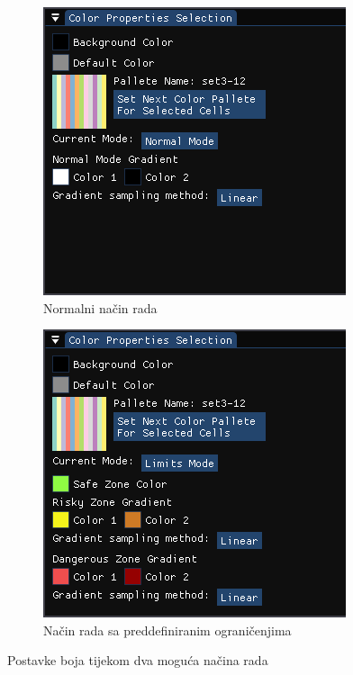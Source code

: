 \documentclass[times, utf8, diplomski]{fer}
\begin{document}
\begin{figure} [H]
     \centering
     \begin{subfigure}[h]{0.49\textwidth}
         \centering
         \includegraphics[width=\textwidth]{color_settings_normal_mode.png}
         \caption{Normalni način rada}
         \label{fig:color-settings-normal-mode}
     \end{subfigure}
     \hfill
     \begin{subfigure}[h]{0.49\textwidth}
         \centering
         \includegraphics[width=\textwidth]{color_settings_limits_mode.png}
         \caption{Način rada sa preddefiniranim ograničenjima}
         \label{fig:color-settings-limits-mode}
     \end{subfigure}
     \caption{Postavke boja tijekom dva moguća načina rada\\}
     \label{fig:color-settings-2-modes}
\end{figure}
\end{document}

